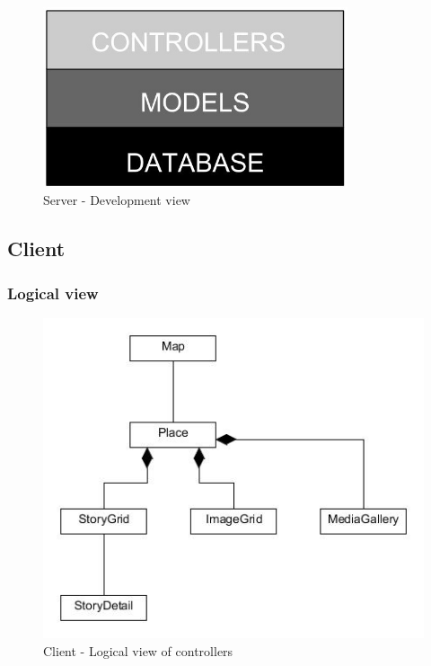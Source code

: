 \documentclass[11pt]{book}
\begin{document}
\begin{figure}[H]
      \centering
      \includegraphics[width=0.8\textwidth]{Figures/Architecture/serverDevelopment.jpg}
      \caption{Server - Development view}
      \label{fig:arch_server_development}
\end{figure}

\subsection{Client}

\subsubsection{Logical view}

\begin{figure}[H]
      \centering
      \includegraphics[width=1.0\textwidth]{Figures/Architecture/clientLogicalController.jpg}
      \caption{Client - Logical view of controllers}
      \label{fig:arch_client_logical_controllers}
\end{figure}
\end{document}
